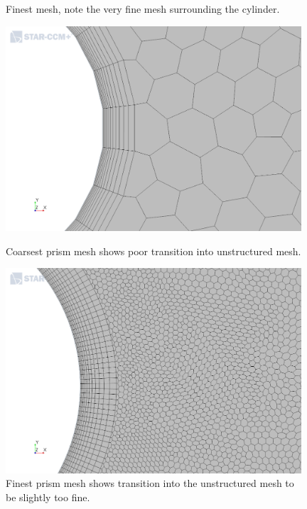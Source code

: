 \documentclass[10pt,english]{article}
\begin{document}
\begin{figure}[h]
\begin{minipage}{.49\textwidth}
\caption{\vspace{00pt}Finest mesh, note the very fine mesh surrounding the cylinder.}
\label{f:cylinder_2_625_MeshScene2_2}
\end{minipage}
\end{figure}

\begin{figure}[h]
\centering
\begin{minipage}{.49\textwidth}
  \centering
\includegraphics[trim={2.0cm 0cm 2.5cm .5cm},clip,width=0.98\textwidth]{cylinder_2_1_MeshScene3.png}
\caption{Coarsest prism mesh shows poor transition into unstructured mesh.}
\label{f:cylinder_2_1_MeshScene3}
\end{minipage}%
\hspace{5pt}
\begin{minipage}{.49\textwidth}
  \centering
\includegraphics[trim={2.0cm 0cm 2.5cm .5cm},clip,width=0.98\textwidth]{cylinder_2_625_MeshScene3.png}
\caption{\vspace{0pt}Finest prism mesh shows transition into the unstructured mesh to be slightly too fine.}
\label{f:cylinder_2_625_MeshScene3}
\end{minipage}
\end{figure}
\end{document}
